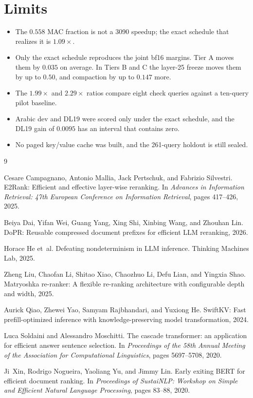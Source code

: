 \documentclass[11pt, a4paper]{article}
\begin{document}
\section{Limits}

\begin{itemize}
\item The $0.558$ MAC fraction is not a 3090 speedup; the exact schedule that realizes it is $1.09\times$.
\item Only the exact schedule reproduces the joint bf16 margins. Tier A moves them by $0.035$ on average. In Tiers B and C the layer-25 freeze moves them by up to $0.50$, and compaction by up to $0.147$ more.
\item The $1.99\times$ and $2.29\times$ ratios compare eight check queries against a ten-query pilot baseline.
\item Arabic dev and DL19 were scored only under the exact schedule, and the DL19 gain of $0.0095$ has an interval that contains zero.
\item No paged key/value cache was built, and the 261-query holdout is still sealed.
\end{itemize}

\begin{thebibliography}{9}

Cesare Campagnano, Antonio Mallia, Jack Pertschuk, and Fabrizio Silvestri.
\newblock E2Rank: Efficient and effective layer-wise reranking.
\newblock In \emph{Advances in Information Retrieval: 47th European Conference on Information Retrieval}, pages 417--426, 2025.

Beiya Dai, Yifan Wei, Guang Yang, Xing Shi, Xinbing Wang, and Zhouhan Lin.
\newblock DoPR: Reusable compressed document prefixes for efficient LLM reranking, 2026.

Horace He et~al.
\newblock Defeating nondeterminism in LLM inference.
\newblock Thinking Machines Lab, 2025.

Zheng Liu, Chaofan Li, Shitao Xiao, Chaozhuo Li, Defu Lian, and Yingxia Shao.
\newblock Matryoshka re-ranker: A flexible re-ranking architecture with configurable depth and width, 2025.

Aurick Qiao, Zhewei Yao, Samyam Rajbhandari, and Yuxiong He.
\newblock SwiftKV: Fast prefill-optimized inference with knowledge-preserving model transformation, 2024.

Luca Soldaini and Alessandro Moschitti.
\newblock The cascade transformer: an application for efficient answer sentence selection.
\newblock In \emph{Proceedings of the 58th Annual Meeting of the Association for Computational Linguistics}, pages 5697--5708, 2020.

Ji~Xin, Rodrigo Nogueira, Yaoliang Yu, and Jimmy Lin.
\newblock Early exiting BERT for efficient document ranking.
\newblock In \emph{Proceedings of SustaiNLP: Workshop on Simple and Efficient Natural Language Processing}, pages 83--88, 2020.

\end{thebibliography}
\end{document}
